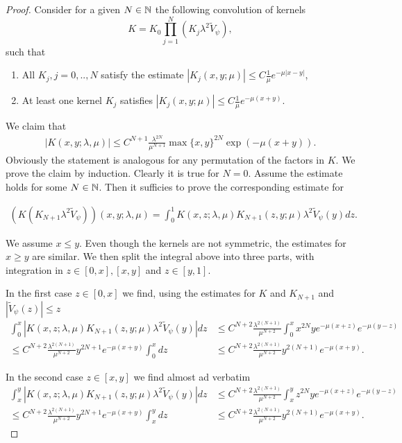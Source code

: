 \begin{proof}
Consider for a given $N\in \mathbb{N}$ the following convolution of kernels
\[
K=K_0\prod\limits_{j=1}^N \left(K_j \lambda^2 \widetilde{V}_\psi  \right),
\]
such that 
\begin{enumerate}
\item All $K_j, j=0,..,N$ satisfy the estimate $|K_j(x,y;\mu)| \leq C \frac{1}{\mu} e^{-\mu |x-y|}$, \\
\item At least one kernel $K_j$ satisfies $|K_j(x,y;\mu)| \leq C \frac{1}{\mu} e^{-\mu (x+y)}$.
\end{enumerate}
We claim that 
\begin{align}
|K(x,y;\lambda,\mu)| \leq C^{N+1} \frac{\lambda^{2N}}{\mu^{N+1}} \max \{x,y\}^{2N} 
\exp (-\mu (x+y)).
\end{align}
Obviously the statement is analogous for any permutation of the factors in $K$. 
We prove the claim by induction. Clearly it is true for $N=0$. 
Assume the estimate holds for some $N\in \mathbb{N}$. Then it sufficies to prove 
the corresponding estimate for 

\begin{align*}
\left(K  ( K_{N+1} \lambda^2 \widetilde{V}_\psi )\right)(x,y;\lambda,\mu) =
\int_0^1 K(x,z;\lambda,\mu) K_{N+1}(z,y;\mu)\lambda^2 \widetilde{V}_\psi(y) dz.
\end{align*}

We assume $x \leq y$. Even though the kernels are not symmetric, 
the estimates for $x\geq y$ are similar. We then split the integral above into 
three parts, with integration in $z\in [0,x], [x,y]$ and $z\in [y,1]$.

In the first case $z\in [0,x]$ we find, using the estimates for $K$ and $K_{N+1}$
and $|\widetilde{V}_\psi(z)|\leq z$
\begin{align*}
\int_0^x | K(x,z;\lambda,\mu) K_{N+1}(z,y;\mu)\lambda^2 \widetilde{V}_\psi(y)| dz 
&\leq C^{N+2} \frac{\lambda^{2(N+1)}}{\mu^{N+2}} 
\int_0^x x^{2N} y e^{-\mu(x+z)} e^{-\mu(y-z)} \\
\leq C^{N+2} \frac{\lambda^{2(N+1)}}{\mu^{N+2}} y^{2N+1} e^{-\mu(x+y)} \int_0^x dz 
& \leq C^{N+2} \frac{\lambda^{2(N+1)}}{\mu^{N+2}} y^{2(N+1)} e^{-\mu(x+y)}.
\end{align*}

In the second case $z\in [x,y]$ we find almost ad verbatim
\begin{align*}
\int_x^y | K(x,z;\lambda,\mu) K_{N+1}(z,y;\mu)\lambda^2 \widetilde{V}_\psi(y)| dz 
&\leq C^{N+2} \frac{\lambda^{2(N+1)}}{\mu^{N+2}} 
\int_x^y z^{2N} y e^{-\mu(x+z)} e^{-\mu(y-z)} \\
\leq C^{N+2} \frac{\lambda^{2(N+1)}}{\mu^{N+2}} y^{2N+1} e^{-\mu(x+y)} \int_x^y dz 
& \leq C^{N+2} \frac{\lambda^{2(N+1)}}{\mu^{N+2}} y^{2(N+1)} e^{-\mu(x+y)}.
\end{align*}


\end{proof}
